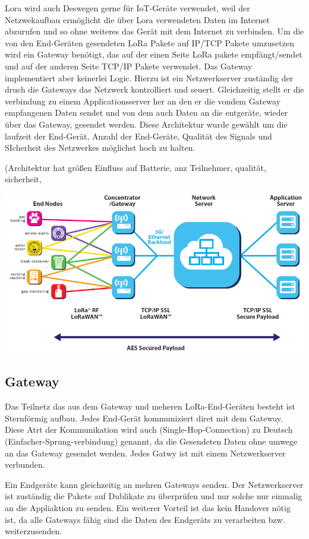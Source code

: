 \documentclass[a4paper,12pt]{article}
\begin{document}
        Lora wird auch Deswegen gerne für IoT-Geräte verwendet, weil der Netzwekaufbau ermöglicht die über Lora verwendeten Daten im Internet abzurufen und so ohne weiteres das Gerät mit dem Internet zu verbinden. Um die von den End-Geräten gesendeten LoRa Pakete auf IP/TCP Pakete umzusetzen wird ein Gateway benötigt, das auf der einen Seite LoRa pakete empfängt/sendet und auf der anderen Seite TCP/IP Pakete verwendet.
        Das Gateway implementiert aber keinerlei Logic. Hierzu ist ein Netzwerkserver zuständig der druch die Gateways das Netzwerk kontrolliert und seuert. Gleichzeitig stellt er die verbindung zu einem Applicationsserver her an den er die vondem Gateway empfangenen Daten sendet und von dem auch Daten an die entgeräte, wieder über das Gateway, gesendet werden.
        Diese Architektur wurde gewählt um die laufzeit der End-Gerät, Anzahl der End-Geräte, Qualität des Signals und SIcherheit des Netzwerkes möglichst hoch zu halten.


        \cite{WhatIsLoRa}(Architektur hat größen Einfluss auf Batterie, anz Teilnehmer, qualität, sicherheit,


        \includegraphics[width=\textwidth]{Netzwerkaufbau}
        
        \subsection{Gateway}
            Das Teilnetz das aus dem Gateway und meheren LoRa-End-Geräten besteht ist Sternförmig aufbau. Jedes End-Gerät kommuniziert diret mit dem Gateway. Diese Atrt der Kommunikation wird auch (Single-Hop-Connection) zu Deutsch (Einfacher-Sprung-verbindung) genannt, da die Gesendeten Daten ohne umwege an das Gateway gesendet werden. Jedes Gatwy ist mit einem Netzwerkserver verbunden.

            Ein Endgeräte kann gleichzeitig an mehren Gateways senden. Der Netzwerkserver ist zuständig die Pakete auf Dublikate zu überprüfen und nur solche nur einmalig an die Appliaktion zu senden.
            Ein weiterer Vorteil ist das kein Handover nötig ist, da alle Gateways fähig sind die Daten des Endgeräts zu verarbeiten bzw. weiterzusenden.
            
\end{document}
